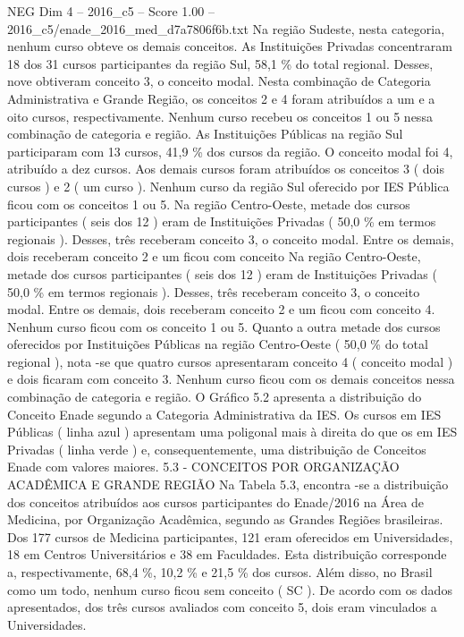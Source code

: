 \begin{textsample}{NEG Dim 4 – 2016\_c5 – Score 1.00 – 2016\_c5/enade\_2016\_med\_d7a7806f6b.txt}
Na região Sudeste, nesta categoria, nenhum curso obteve os demais conceitos.
As Instituições Privadas concentraram 18 dos 31 cursos participantes da região Sul, 58,1 \% do total regional.
Desses, nove obtiveram conceito 3, o conceito modal.
Nesta combinação de Categoria Administrativa e Grande Região, os conceitos 2 e 4 foram atribuídos a um e a oito cursos, respectivamente.
Nenhum curso recebeu os conceitos 1 ou 5 nessa combinação de categoria e região.
As Instituições Públicas na região Sul participaram com 13 cursos, 41,9 \% dos cursos da região.
O conceito modal foi 4, atribuído a dez cursos.
Aos demais cursos foram atribuídos os conceitos 3 ( dois cursos ) e 2 ( um curso ).
Nenhum curso da região Sul oferecido por IES Pública ficou com os conceitos 1 ou 5.
Na região Centro-Oeste, metade dos cursos participantes ( seis dos 12 ) eram de Instituições Privadas ( 50,0 \% em termos regionais ).
Desses, três receberam conceito 3, o conceito modal.
Entre os demais, dois receberam conceito 2 e um ficou com conceito Na região Centro-Oeste, metade dos cursos participantes ( seis dos 12 ) eram de Instituições Privadas ( 50,0 \% em termos regionais ).
Desses, três receberam conceito 3, o conceito modal.
Entre os demais, dois receberam conceito 2 e um ficou com conceito 4.
Nenhum curso ficou com os conceito 1 ou 5.
Quanto a outra metade dos cursos oferecidos por Instituições Públicas na região Centro-Oeste ( 50,0 \% do total regional ), nota -se que quatro cursos apresentaram conceito 4 ( conceito modal ) e dois ficaram com conceito 3.
Nenhum curso ficou com os demais conceitos nessa combinação de categoria e região.
O Gráfico 5.2 apresenta a distribuição do Conceito Enade segundo a Categoria Administrativa da IES.
Os cursos em IES Públicas ( linha azul ) apresentam uma poligonal mais à direita do que os em IES Privadas ( linha verde ) e, consequentemente, uma distribuição de Conceitos Enade com valores maiores. 5.3 - CONCEITOS POR ORGANIZAÇÃO ACADÊMICA E GRANDE REGIÃO Na Tabela 5.3, encontra -se a distribuição dos conceitos atribuídos aos cursos participantes do Enade/2016 na Área de Medicina, por Organização Acadêmica, segundo as Grandes Regiões brasileiras.
Dos 177 cursos de Medicina participantes, 121 eram oferecidos em Universidades, 18 em Centros Universitários e 38 em Faculdades.
Esta distribuição corresponde a, respectivamente, 68,4 \%, 10,2 \% e 21,5 \% dos cursos.
Além disso, no Brasil como um todo, nenhum curso ficou sem conceito ( SC ).
De acordo com os dados apresentados, dos três cursos avaliados com conceito 5, dois eram vinculados a Universidades.

\end{textsample}

